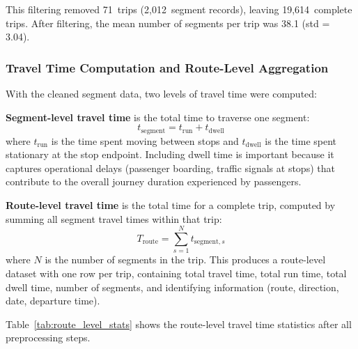 This filtering removed 71~trips (2,012~segment records), leaving 19,614~complete trips. After filtering, the mean number of segments per trip was 38.1 (std = 3.04).

\subsubsection{Travel Time Computation and Route-Level Aggregation}
\label{subsubsec:aggregation}

With the cleaned segment data, two levels of travel time were computed:

\textbf{Segment-level travel time} is the total time to traverse one segment:
\begin{equation}
    t_{\text{segment}} = t_{\text{run}} + t_{\text{dwell}}
\end{equation}
where $t_{\text{run}}$ is the time spent moving between stops and $t_{\text{dwell}}$ is the time spent stationary at the stop endpoint. Including dwell time is important because it captures operational delays (passenger boarding, traffic signals at stops) that contribute to the overall journey duration experienced by passengers.

\textbf{Route-level travel time} is the total time for a complete trip, computed by summing all segment travel times within that trip:
\begin{equation}
    T_{\text{route}} = \sum_{s=1}^{N} t_{\text{segment},s}
\end{equation}
where $N$ is the number of segments in the trip. This produces a route-level dataset with one row per trip, containing total travel time, total run time, total dwell time, number of segments, and identifying information (route, direction, date, departure time).

Table~\ref{tab:route_level_stats} shows the route-level travel time statistics after all preprocessing steps.

